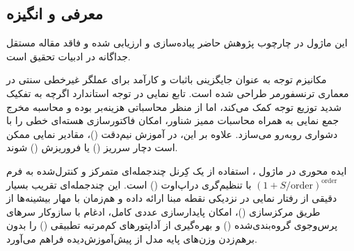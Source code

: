 \subsection{معرفی و انگیزه}
این ماژول در چارچوب پژوهش حاضر پیاده‌سازی و ارزیابی شده و فاقد مقاله مستقل جداگانه در ادبیات تحقیق است.

مکانیزم توجه  به عنوان جایگزینی باثبات و کارآمد برای عملگر غیرخطی سنتی  در معماری ترنسفورمر طراحی شده است. تابع نمایی در توجه استاندارد اگرچه به تفکیک شدید توزیع توجه کمک می‌کند، اما از منظر محاسباتی هزینه‌بر بوده و محاسبه مخرج جمع نمایی به همراه محاسبات ممیز شناور، امکان فاکتورسازی هسته‌ای خطی را با دشواری روبه‌رو می‌سازد. علاوه بر این، در آموزش نیم‌دقت ()، مقادیر نمایی ممکن است دچار سرریز () یا فروریزش () شوند.

ایده محوری در ماژول ، استفاده از یک کِرنل چندجمله‌ای متمرکز و کنترل‌شده به فرم $(1 + S/\text{order})^{\text{order}}$ با تنظیم‌گری دراپ‌اوت () است. این چندجمله‌ای تقریب بسیار دقیقی از رفتار نمایی در نزدیکی نقطه مبنا ارائه داده و هم‌زمان با مهار بیشینه‌ها از طریق مرکزسازی ()، امکان پایدارسازی عددی کامل، ادغام با سازوکار سرهای پرس‌وجوی گروه‌بندی‌شده () و بهره‌گیری از آداپتورهای کم‌مرتبه تطبیقی () را بدون برهم‌زدن وزن‌های پایه مدل از پیش‌آموزش‌دیده فراهم می‌آورد.
